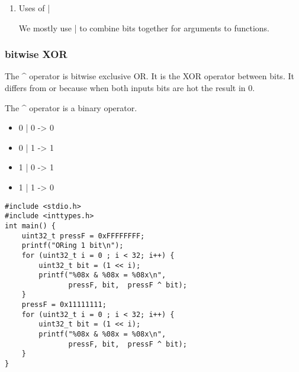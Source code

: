 \documentclass[11pt]{article}
\begin{document}
\begin{enumerate}
\item Uses of |
\label{sec:org7ea7897}

We mostly use | to combine bits together for arguments to functions.
\end{enumerate}

\subsubsection{bitwise XOR}
\label{sec:org27c087e}

The \^{} operator is bitwise exclusive OR. It is the XOR operator between
bits. It differs from or because when both inputs bits are hot the
result in 0.

The \^{} operator is a binary operator.

\begin{itemize}
\item 0 | 0 -> 0
\item 0 | 1 -> 1
\item 1 | 0 -> 1
\item 1 | 1 -> 0
\end{itemize}

\begin{verbatim}
#include <stdio.h>
#include <inttypes.h>
int main() {  
    uint32_t pressF = 0xFFFFFFFF;
    printf("ORing 1 bit\n");
    for (uint32_t i = 0 ; i < 32; i++) {
        uint32_t bit = (1 << i);
        printf("%08x & %08x = %08x\n",
               pressF, bit,  pressF ^ bit);
    }
    pressF = 0x11111111;
    for (uint32_t i = 0 ; i < 32; i++) {
        uint32_t bit = (1 << i);
        printf("%08x & %08x = %08x\n",
               pressF, bit,  pressF ^ bit);
    }
}
\end{verbatim}
\end{document}
